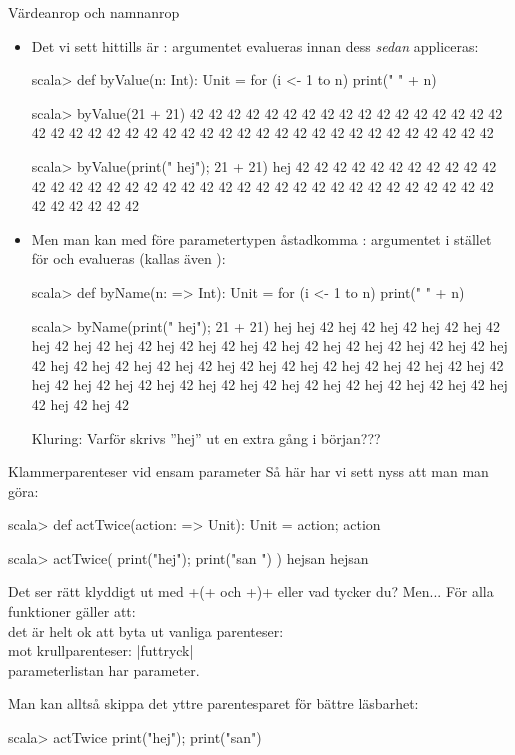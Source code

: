 \begin{Slide}{Värdeanrop och namnanrop}\SlideFontSmall
\begin{itemize}
\item Det vi sett hittills är : argumentet evalueras  innan dess  \emph{sedan} appliceras:
\begin{REPL}
scala> def byValue(n: Int): Unit = for (i <- 1 to n) print(" " + n)

scala> byValue(21 + 21)
 42 42 42 42 42 42 42 42 42 42 42 42 42 42 42 42 42 42 42 42 42 42 42 42 42 42 42 42 42 42 42 42 42 42 42 42 42 42 42 42 42 42

scala> byValue({print(" hej"); 21 + 21})
 hej 42 42 42 42 42 42 42 42 42 42 42 42 42 42 42 42 42 42 42 42 42 42 42 42 42 42 42 42 42 42 42 42 42 42 42 42 42 42 42 42 42 42
\end{REPL}
\item Men man kan med \code{=>} före parametertypen åstadkomma : argumentet  i stället för  och evalueras  (kallas även ):
\begin{REPL}
scala> def byName(n: => Int): Unit = for (i <- 1 to n) print(" " + n)

scala> byName({print(" hej"); 21 + 21})
 hej hej 42 hej 42 hej 42 hej 42 hej 42 hej 42 hej 42 hej 42 hej 42 hej 42 hej 42 hej 42 hej 42 hej 42 hej 42 hej 42 hej 42 hej 42 hej 42 hej 42 hej 42 hej 42 hej 42 hej 42 hej 42 hej 42 hej 42 hej 42 hej 42 hej 42 hej 42 hej 42 hej 42 hej 42 hej 42 hej 42 hej 42 hej 42 hej 42 hej 42 hej 42 hej 42
\end{REPL}

Kluring: Varför skrivs ''hej'' ut en extra gång i början???
\end{itemize}
\end{Slide}

\begin{Slide}{Klammerparenteser vid ensam parameter}
Så här har vi sett nyss att man man göra:
\begin{REPL}
scala> def actTwice(action: => Unit): Unit = { action; action }

scala> actTwice( { print("hej"); print("san ") } )
hejsan hejsan
\end{REPL}

Det ser rätt klyddigt ut med \code+{(+  och \code+)}+ eller vad tycker du? \pause Men...
För alla funktioner  gäller att: \\ det är helt ok att byta ut vanliga parenteser: \hfill{} \\ mot krullparenteser: \hfill\code|f{uttryck}| \\  parameterlistan har  parameter.

\vspace{0.5em}Man kan alltså skippa det yttre parentesparet för bättre läsbarhet:
\begin{REPLnonum}
scala> actTwice { print("hej"); print("san") }
\end{REPLnonum}


\end{Slide}

